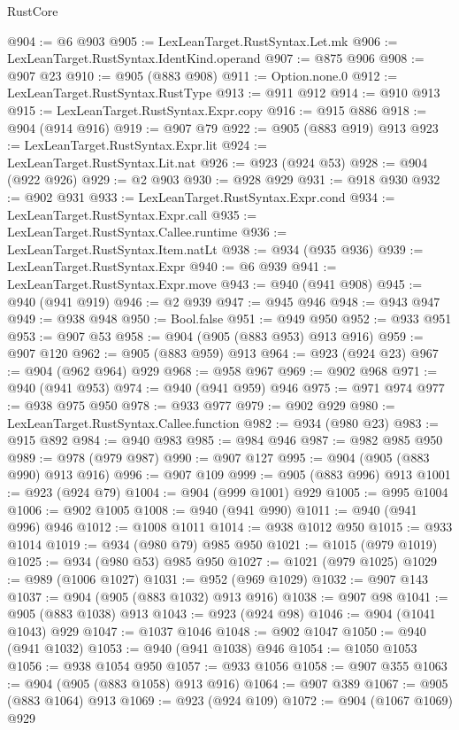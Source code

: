 \begin{lexlean}{RustCore}
\begin{coremodule}
@904 := @6 @903
@905 := LexLeanTarget.RustSyntax.Let.mk
@906 := LexLeanTarget.RustSyntax.IdentKind.operand
@907 := @875 @906
@908 := @907 @23
@910 := @905 (@883 @908)
@911 := Option.none.{0}
@912 := LexLeanTarget.RustSyntax.RustType
@913 := @911 @912
@914 := @910 @913
@915 := LexLeanTarget.RustSyntax.Expr.copy
@916 := @915 @886
@918 := @904 (@914 @916)
@919 := @907 @79
@922 := @905 (@883 @919) @913
@923 := LexLeanTarget.RustSyntax.Expr.lit
@924 := LexLeanTarget.RustSyntax.Lit.nat
@926 := @923 (@924 @53)
@928 := @904 (@922 @926)
@929 := @2 @903
@930 := @928 @929
@931 := @918 @930
@932 := @902 @931
@933 := LexLeanTarget.RustSyntax.Expr.cond
@934 := LexLeanTarget.RustSyntax.Expr.call
@935 := LexLeanTarget.RustSyntax.Callee.runtime
@936 := LexLeanTarget.RustSyntax.Item.natLt
@938 := @934 (@935 @936)
@939 := LexLeanTarget.RustSyntax.Expr
@940 := @6 @939
@941 := LexLeanTarget.RustSyntax.Expr.move
@943 := @940 (@941 @908)
@945 := @940 (@941 @919)
@946 := @2 @939
@947 := @945 @946
@948 := @943 @947
@949 := @938 @948
@950 := Bool.false
@951 := @949 @950
@952 := @933 @951
@953 := @907 @53
@958 := @904 (@905 (@883 @953) @913 @916)
@959 := @907 @120
@962 := @905 (@883 @959) @913
@964 := @923 (@924 @23)
@967 := @904 (@962 @964) @929
@968 := @958 @967
@969 := @902 @968
@971 := @940 (@941 @953)
@974 := @940 (@941 @959) @946
@975 := @971 @974
@977 := @938 @975 @950
@978 := @933 @977
@979 := @902 @929
@980 := LexLeanTarget.RustSyntax.Callee.function
@982 := @934 (@980 @23)
@983 := @915 @892
@984 := @940 @983
@985 := @984 @946
@987 := @982 @985 @950
@989 := @978 (@979 @987)
@990 := @907 @127
@995 := @904 (@905 (@883 @990) @913 @916)
@996 := @907 @109
@999 := @905 (@883 @996) @913
@1001 := @923 (@924 @79)
@1004 := @904 (@999 @1001) @929
@1005 := @995 @1004
@1006 := @902 @1005
@1008 := @940 (@941 @990)
@1011 := @940 (@941 @996) @946
@1012 := @1008 @1011
@1014 := @938 @1012 @950
@1015 := @933 @1014
@1019 := @934 (@980 @79) @985 @950
@1021 := @1015 (@979 @1019)
@1025 := @934 (@980 @53) @985 @950
@1027 := @1021 (@979 @1025)
@1029 := @989 (@1006 @1027)
@1031 := @952 (@969 @1029)
@1032 := @907 @143
@1037 := @904 (@905 (@883 @1032) @913 @916)
@1038 := @907 @98
@1041 := @905 (@883 @1038) @913
@1043 := @923 (@924 @98)
@1046 := @904 (@1041 @1043) @929
@1047 := @1037 @1046
@1048 := @902 @1047
@1050 := @940 (@941 @1032)
@1053 := @940 (@941 @1038) @946
@1054 := @1050 @1053
@1056 := @938 @1054 @950
@1057 := @933 @1056
@1058 := @907 @355
@1063 := @904 (@905 (@883 @1058) @913 @916)
@1064 := @907 @389
@1067 := @905 (@883 @1064) @913
@1069 := @923 (@924 @109)
@1072 := @904 (@1067 @1069) @929

\end{coremodule}
\end{lexlean}
